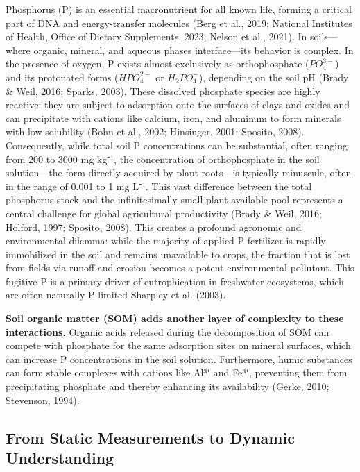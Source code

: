 \documentclass[
  a4paper,
]{article}
\begin{document}
Phosphorus (P) is an essential macronutrient for all known life, forming
a critical part of DNA and energy-transfer molecules (Berg et al., 2019;
National Institutes of Health, Office of Dietary Supplements, 2023;
Nelson et al., 2021). In soils---where organic, mineral, and aqueous
phases interface---its behavior is complex. In the presence of oxygen, P
exists almost exclusively as orthophosphate (\(PO_4^{3-}\)) and its
protonated forms (\(HPO_4^{2-}\) or \(H_2PO_4^{-}\)), depending on the
soil pH (Brady \& Weil, 2016; Sparks, 2003). These dissolved phosphate
species are highly reactive; they are subject to adsorption onto the
surfaces of clays and oxides and can precipitate with cations like
calcium, iron, and aluminum to form minerals with low solubility (Bohn
et al., 2002; Hinsinger, 2001; Sposito, 2008). Consequently, while total
soil P concentrations can be substantial, often ranging from 200 to 3000
mg kg⁻¹, the concentration of orthophosphate in the soil solution---the
form directly acquired by plant roots---is typically minuscule, often in
the range of 0.001 to 1 mg L⁻¹. This vast difference between the total
phosphorus stock and the infinitesimally small plant-available pool
represents a central challenge for global agricultural productivity
(Brady \& Weil, 2016; Holford, 1997; Sposito, 2008). This creates a
profound agronomic and environmental dilemma: while the majority of
applied P fertilizer is rapidly immobilized in the soil and remains
unavailable to crops, the fraction that is lost from fields via runoff
and erosion becomes a potent environmental pollutant. This fugitive P is
a primary driver of eutrophication in freshwater ecosystems, which are
often naturally P-limited Sharpley et al. (2003).

\textbf{Soil organic matter (SOM) adds another layer of complexity to
these interactions.} Organic acids released during the decomposition of
SOM can compete with phosphate for the same adsorption sites on mineral
surfaces, which can increase P concentrations in the soil solution.
Furthermore, humic substances can form stable complexes with cations
like Al³⁺ and Fe³⁺, preventing them from precipitating phosphate and
thereby enhancing its availability (Gerke, 2010; Stevenson, 1994).

\subsection{From Static Measurements to Dynamic
Understanding}\label{from-static-measurements-to-dynamic-understanding}
\end{document}
